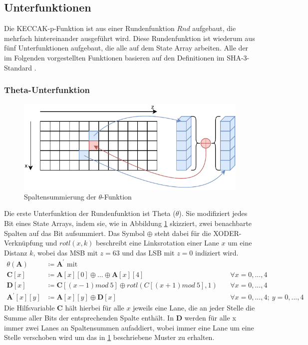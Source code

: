 \subsection{Unterfunktionen}
\label{cha:sha3_unterfunktionen}
Die KECCAK-p-Funktion ist aus einer Rundenfunktion $Rnd$ aufgebaut, die mehrfach hintereinander ausgeführt wird.
Diese Rundenfunktion ist wiederum aus fünf Unterfunktionen aufgebaut, die alle auf dem State Array arbeiten.
Alle der im Folgenden vorgestellten Funktionen basieren auf den Definitionen im SHA-3-Standard \cite{sha3-standard}.

\subsubsection{Theta-Unterfunktion}
\begin{figure}
    \center
    \includegraphics{images/theta.pdf}
    \caption{Spaltensummierung der $\theta$-Funktion}
    \label{fig:definition_theta}
\end{figure}
Die erste Unterfunktion der Rundenfunktion ist Theta ($\theta$). Sie modifiziert jedes Bit eines State Arrays,
indem sie, wie in Abbildung \ref{fig:definition_theta} skizziert, zwei benachbarte Spalten auf das Bit aufsummiert.
Das Symbol $\oplus$ steht dabei für die XODER-Verknüpfung und $rotl(x, k)$ beschreibt eine Linksrotation
einer Lane $x$ um eine Distanz $k$, wobei das MSB mit $z = 63$ und das LSB mit $z = 0$ indiziert wird.
\begin{align*}
    \theta (\textbf{A}) & \coloneq \textbf{A}^\prime \text{ mit } \\
    \textbf{C}[x] & \coloneq \textbf{A}[x][0] \oplus ... \oplus \textbf{A}[x][4] && \forall x = 0,...,4 \\
    \textbf{D}[x] & \coloneq \textbf{C}[(x - 1) mod\ 5] \oplus rotl(C[(x + 1) mod\ 5], 1)\ && \forall x = 0,...,4 \\
    \textbf{A}^\prime[x][y] & \coloneq \textbf{A}[x][y] \oplus \textbf{D}[x]\ && \forall x = 0,...,4;\ y = 0,...,4
\end{align*}
Die Hilfsvariable \textbf{C} hält hierbei für alle $x$ jeweils eine Lane, die an jeder Stelle die Summe aller Bits
der entsprechenden Spalte enthält. In \textbf{D} werden für alle x immer zwei Lanes an Spaltensummen aufaddiert, wobei immer
eine Lane um eine Stelle verschoben wird um das in \ref{fig:definition_theta} beschriebene Muster zu erhalten.

